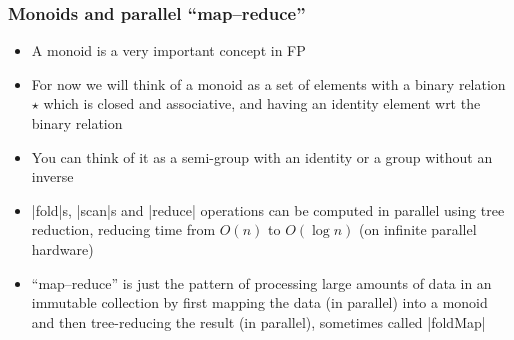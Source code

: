 \documentclass[mathserif,handout]{beamer}
\begin{document}
\begin{frame}[fragile]
  \frametitle{Monoids and parallel ``map--reduce''}
  \begin{itemize}
  \item A \alert{monoid} is a very important concept in FP
  \item For now we will think of a monoid as a \alert{set} of elements with a \alert{binary relation} $\star$ which is \alert{closed} and \alert{associative}, and having an \alert{identity} element wrt the binary relation
  \item You can think of it as a \alert{semi-group} with an identity or a \alert{group} without an inverse
  \item |fold|s, |scan|s and |reduce| operations can be computed in parallel using \alert{tree reduction}, reducing time from $O(n)$ to $O(\log n)$ (on infinite parallel hardware)
  \item ``\alert{map--reduce}'' is just the pattern of processing large amounts of data in an immutable collection by first \alert{map}ping the data (in parallel) into a monoid and then tree-\alert{reduc}ing the result (in parallel), sometimes called |foldMap|
  \end{itemize}
\end{frame}

\end{document}
